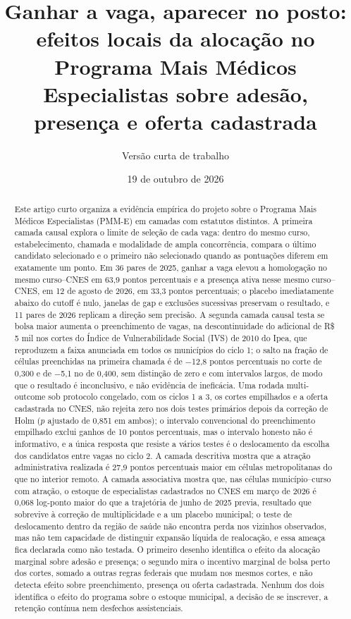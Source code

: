 \documentclass[11pt,a4paper]{article}
\title{Ganhar a vaga, aparecer no posto:\\
efeitos locais da alocação no Programa Mais Médicos Especialistas sobre adesão,
presença e oferta cadastrada}
\author{Versão curta de trabalho}
\date{19 de outubro de 2026}
\begin{document}
\maketitle

\begin{abstract}
Este artigo curto organiza a evidência empírica do projeto sobre o Programa Mais
Médicos Especialistas (PMM-E) em camadas com estatutos distintos. A primeira
camada causal explora o limite de seleção de cada vaga: dentro do mesmo curso,
estabelecimento, chamada e modalidade de ampla concorrência, compara o último
candidato selecionado e o primeiro não selecionado quando as pontuações diferem
em exatamente um ponto. Em 36 pares de 2025, ganhar a vaga elevou a homologação
no mesmo curso--CNES em 63,9 pontos percentuais e a presença ativa nesse mesmo
curso--CNES, em 12 de agosto de 2026, em 33,3 pontos percentuais; o placebo
imediatamente abaixo do cutoff é nulo, janelas de gap e exclusões sucessivas
preservam o resultado, e 11 pares de 2026 replicam a direção sem precisão. A
segunda camada causal testa se bolsa maior aumenta o preenchimento de vagas, na
descontinuidade do adicional de R\$ 5 mil nos cortes do Índice de
Vulnerabilidade Social (IVS) de 2010 do Ipea, que reproduzem a faixa anunciada
em todos os municípios do ciclo 1; o salto na fração de células preenchidas na
primeira chamada é de $-$12,8 pontos percentuais no corte de 0,300 e de
$-$5,1 no de 0,400, sem distinção de zero e com intervalos largos, de modo que
o resultado é inconclusivo, e não evidência de ineficácia. Uma
rodada multi-outcome sob protocolo congelado, com os ciclos 1 a 3, os cortes
empilhados e a oferta cadastrada no CNES, não rejeita zero nos dois testes
primários depois da correção de Holm ($p$ ajustado de 0,851 em ambos); o
intervalo convencional do preenchimento empilhado exclui ganhos de 10 pontos
percentuais, mas o intervalo honesto não é informativo, e a única resposta que
resiste a vários testes é o deslocamento da escolha dos candidatos entre vagas
no ciclo 2. A
camada descritiva mostra que a atração administrativa realizada é 27,9 pontos
percentuais maior em células metropolitanas do que no interior remoto. A camada
associativa mostra que, nas células município--curso com atração, o estoque de
especialistas cadastrados no CNES em março de 2026 é 0,068 log-ponto maior do
que a trajetória de junho de 2025 previa, resultado que sobrevive à correção de
multiplicidade e a um placebo municipal; o teste de deslocamento dentro da
região de saúde não encontra perda nos vizinhos observados, mas não tem
capacidade de distinguir expansão líquida de realocação, e essa ameaça fica
declarada como não testada. O primeiro desenho identifica o efeito da alocação
marginal sobre adesão e presença; o segundo mira o incentivo marginal de bolsa
perto dos cortes, somado a outras regras federais que mudam nos mesmos cortes,
e não detecta efeito sobre preenchimento, presença ou oferta cadastrada.
Nenhum dos dois identifica o efeito do programa sobre o estoque
municipal, a decisão de se inscrever, a retenção contínua nem desfechos
assistenciais.
\end{abstract}
\end{document}
